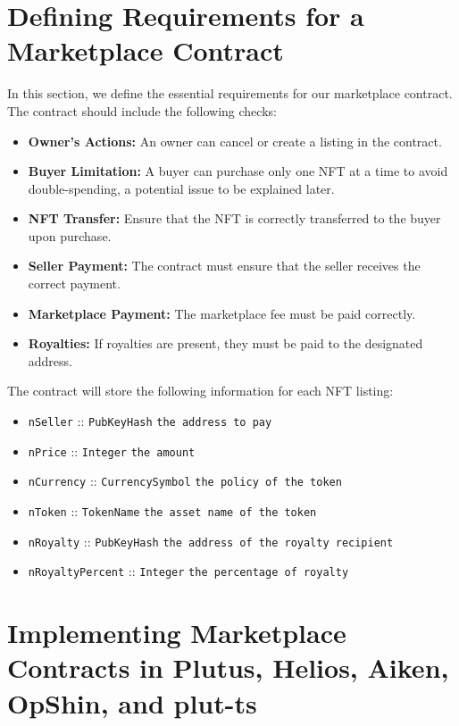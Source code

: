 \section{Defining Requirements for a Marketplace Contract}

In this section, we define the essential requirements for our marketplace contract. The contract should include the following checks:

\begin{itemize}
    \item \textbf{Owner's Actions:} An owner can cancel or create a listing in the contract.
    \item \textbf{Buyer Limitation:} A buyer can purchase only one NFT at a time to avoid double-spending, a potential issue to be explained later.
    \item \textbf{NFT Transfer:} Ensure that the NFT is correctly transferred to the buyer upon purchase.
    \item \textbf{Seller Payment:} The contract must ensure that the seller receives the correct payment.
    \item \textbf{Marketplace Payment:} The marketplace fee must be paid correctly.
    \item \textbf{Royalties:} If royalties are present, they must be paid to the designated address.
\end{itemize}

The contract will store the following information for each NFT listing:

\begin{itemize}
    \item \texttt{nSeller} :: \texttt{PubKeyHash} \texttt{the address to pay}
    \item \texttt{nPrice} :: \texttt{Integer} \texttt{the amount}
    \item \texttt{nCurrency} :: \texttt{CurrencySymbol} \texttt{the policy of the token}
    \item \texttt{nToken} :: \texttt{TokenName} \texttt{the asset name of the token}
    \item \texttt{nRoyalty} :: \texttt{PubKeyHash} \texttt{the address of the royalty recipient}
    \item \texttt{nRoyaltyPercent} :: \texttt{Integer} \texttt{the percentage of royalty}
\end{itemize}

\section{Implementing Marketplace Contracts in Plutus, Helios, Aiken, OpShin, and plut-ts}

